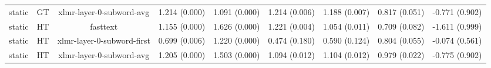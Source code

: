 \begin{sidewaystable}[htb]
\begin{tabular}{@{}ccccccccc@{}}
        static & GT & xlmr-layer-0-subword-avg & 1.214 (0.000) & 1.091 (0.000) & 1.214 (0.006) & 1.188 (0.007) & 0.817 (0.051) & -0.771 (0.902) \\
        static & HT & fasttext & 1.155 (0.000) & 1.626 (0.000) & 1.221 (0.004) & 1.054 (0.011) & 0.709 (0.082) & -1.611 (0.999) \\
        static & HT & xlmr-layer-0-subword-first & 0.699 (0.006) & 1.220 (0.000) & 0.474 (0.180) & 0.590 (0.124) & 0.804 (0.055) & -0.074 (0.561) \\
        static & HT & xlmr-layer-0-subword-avg & 1.205 (0.000) & 1.503 (0.000) & 1.094 (0.012) & 1.104 (0.012) & 0.979 (0.022) & -0.775 (0.902) \\
        \bottomrule
    \end{tabular}
\end{sidewaystable}